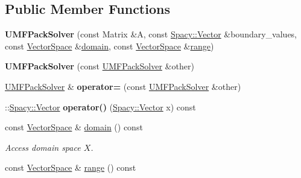 \subsection*{\-Public \-Member \-Functions}
\begin{DoxyCompactItemize}
\item 
\hypertarget{classSpacy_1_1dealII_1_1UMFPackSolver_acc2837eda57e4331e3b18b964fb0a901}{{\bfseries \-U\-M\-F\-Pack\-Solver} (const \-Matrix \&\-A, const \hyperlink{classSpacy_1_1Vector}{\-Spacy\-::\-Vector} \&boundary\-\_\-values, const \hyperlink{classSpacy_1_1VectorSpace}{\-Vector\-Space} \&\hyperlink{classSpacy_1_1OperatorBase_a2588f9b3e0188820c4c494e63293dc6f}{domain}, const \hyperlink{classSpacy_1_1VectorSpace}{\-Vector\-Space} \&\hyperlink{classSpacy_1_1OperatorBase_ab19d3b7a6f290b1079248f1e567e53d6}{range})}\label{classSpacy_1_1dealII_1_1UMFPackSolver_acc2837eda57e4331e3b18b964fb0a901}

\item 
\hypertarget{classSpacy_1_1dealII_1_1UMFPackSolver_adb7083c76e86de9bf4b7da93ce4b453b}{{\bfseries \-U\-M\-F\-Pack\-Solver} (const \hyperlink{classSpacy_1_1dealII_1_1UMFPackSolver}{\-U\-M\-F\-Pack\-Solver} \&other)}\label{classSpacy_1_1dealII_1_1UMFPackSolver_adb7083c76e86de9bf4b7da93ce4b453b}

\item 
\hypertarget{classSpacy_1_1dealII_1_1UMFPackSolver_a4f7e3651b0990072a64b2c4d42ae508b}{\hyperlink{classSpacy_1_1dealII_1_1UMFPackSolver}{\-U\-M\-F\-Pack\-Solver} \& {\bfseries operator=} (const \hyperlink{classSpacy_1_1dealII_1_1UMFPackSolver}{\-U\-M\-F\-Pack\-Solver} \&other)}\label{classSpacy_1_1dealII_1_1UMFPackSolver_a4f7e3651b0990072a64b2c4d42ae508b}

\item 
\hypertarget{classSpacy_1_1dealII_1_1UMFPackSolver_add34a7cd66b176f90da2875913ce12fd}{\-::\hyperlink{classSpacy_1_1Vector}{\-Spacy\-::\-Vector} {\bfseries operator()} (\hyperlink{classSpacy_1_1Vector}{\-Spacy\-::\-Vector} x) const }\label{classSpacy_1_1dealII_1_1UMFPackSolver_add34a7cd66b176f90da2875913ce12fd}

\item 
\hypertarget{classSpacy_1_1OperatorBase_a2588f9b3e0188820c4c494e63293dc6f}{const \hyperlink{classSpacy_1_1VectorSpace}{\-Vector\-Space} \& \hyperlink{classSpacy_1_1OperatorBase_a2588f9b3e0188820c4c494e63293dc6f}{domain} () const }\label{classSpacy_1_1OperatorBase_a2588f9b3e0188820c4c494e63293dc6f}

\begin{DoxyCompactList}\small\item\em \-Access domain space $X$. \end{DoxyCompactList}\item 
\hypertarget{classSpacy_1_1OperatorBase_ab19d3b7a6f290b1079248f1e567e53d6}{const \hyperlink{classSpacy_1_1VectorSpace}{\-Vector\-Space} \& \hyperlink{classSpacy_1_1OperatorBase_ab19d3b7a6f290b1079248f1e567e53d6}{range} () const }\label{classSpacy_1_1OperatorBase_ab19d3b7a6f290b1079248f1e567e53d6}


\end{DoxyCompactItemize}

